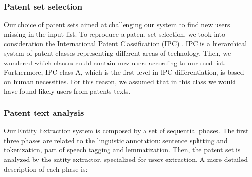 \documentclass[]{book}
\theoremstyle{definition}
\theoremstyle{definition}
\theoremstyle{definition}
\theoremstyle{remark}
\begin{document}
\subsubsection*{Patent set selection}\label{patent-set-selection}

Our choice of patent sets aimed at challenging our system to find new
users missing in the input list. To reproduce a patent set selection, we
took into consideration the International Patent Classification (IPC)
\citep{wipo1}. IPC is a hierarchical system of patent classes
representing different areas of technology. Then, we wondered which
classes could contain new users according to our seed list. Furthermore,
IPC class A, which is the first level in IPC differentiation, is based
on human necessities. For this reason, we assumed that in this class we
would have found likely users from patents texts.

\subsubsection*{Patent text analysis}\label{patent-text-analysis}

Our Entity Extraction system is composed by a set of sequential phases.
The first three phases are related to the linguistic annotation:
sentence splitting and tokenization, part of speech tagging and
lemmatization. Then, the patent set is analyzed by the entity extractor,
specialized for users extraction. A more detailed description of each
phase is:
\end{document}
